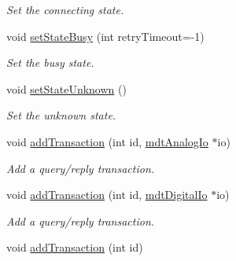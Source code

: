 \begin{DoxyCompactItemize}
\begin{DoxyCompactList}\small\item\em Set the connecting state. \end{DoxyCompactList}\item 
void \hyperlink{classmdt_device_abf01ab213b91df9ff03ad6b7184abf88}{setStateBusy} (int retryTimeout=-\/1)
\begin{DoxyCompactList}\small\item\em Set the busy state. \end{DoxyCompactList}\item 
void \hyperlink{classmdt_device_a312bf413dfc16765328843f3fe08a4b8}{setStateUnknown} ()
\begin{DoxyCompactList}\small\item\em Set the unknown state. \end{DoxyCompactList}\item 
\hypertarget{classmdt_device_a152a866615b291d0344f24948141f9dd}{
void \hyperlink{classmdt_device_a152a866615b291d0344f24948141f9dd}{addTransaction} (int id, \hyperlink{classmdt_analog_io}{mdtAnalogIo} $\ast$io)}
\label{classmdt_device_a152a866615b291d0344f24948141f9dd}

\begin{DoxyCompactList}\small\item\em Add a query/reply transaction. \end{DoxyCompactList}\item 
\hypertarget{classmdt_device_ab7fc34f881527ded34d692da29431f85}{
void \hyperlink{classmdt_device_ab7fc34f881527ded34d692da29431f85}{addTransaction} (int id, \hyperlink{classmdt_digital_io}{mdtDigitalIo} $\ast$io)}
\label{classmdt_device_ab7fc34f881527ded34d692da29431f85}

\begin{DoxyCompactList}\small\item\em Add a query/reply transaction. \end{DoxyCompactList}\item 
\hypertarget{classmdt_device_aebee51bc9e2cbbef1614df8218be1fcd}{
void \hyperlink{classmdt_device_aebee51bc9e2cbbef1614df8218be1fcd}{addTransaction} (int id)}
\label{classmdt_device_aebee51bc9e2cbbef1614df8218be1fcd}


\end{DoxyCompactItemize}
